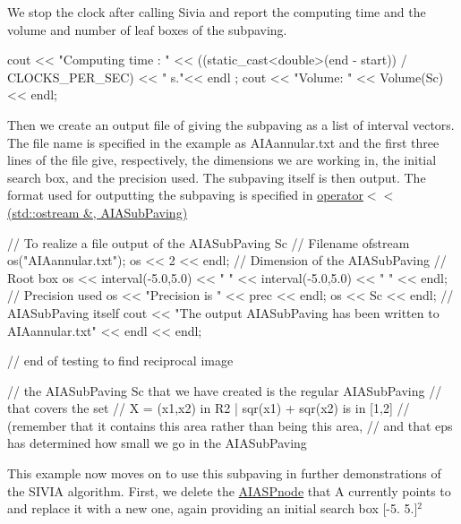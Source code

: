 \-We stop the clock after calling \-Sivia and report the computing time and the volume and number of leaf boxes of the subpaving.


\begin{DoxyCodeInclude}
  cout << "Computing time : " 
       << ((static_cast<double>(end - start)) / CLOCKS_PER_SEC) << " s."<< endl
      ;
  cout << "Volume: " << Volume(Sc) << endl;

\end{DoxyCodeInclude}


\-Then we create an output file of giving the subpaving as a list of interval vectors. \-The file name is specified in the example as \-A\-I\-Aannular.\-txt and the first three lines of the file give, respectively, the dimensions we are working in, the initial search box, and the precision used. \-The subpaving itself is then output. \-The format used for outputting the subpaving is specified in \hyperlink{AIAsubpaving_8cpp_a545707f4bc32ad5dac67608be229b51d}{operator$<$$<$(std\-::ostream \&, A\-I\-A\-Sub\-Paving)}


\begin{DoxyCodeInclude}
  // To realize a file output of the AIASubPaving Sc
                    // Filename
  ofstream os("AIAannular.txt");
  os << 2 << endl;  // Dimension of the AIASubPaving
                    // Root box
  os << interval(-5.0,5.0) << " "
    << interval(-5.0,5.0) << " " << endl;
                    // Precision used
  os << "Precision is " << prec << endl;
  os << Sc << endl; // AIASubPaving itself
  cout << "The output AIASubPaving has been written to AIAannular.txt" 
       << endl << endl;

  // end of testing to find reciprocal image

  // the AIASubPaving Sc that we have created is the regular AIASubPaving 
  // that covers the set
  // X = {(x1,x2) in R2 | sqr(x1) + sqr(x2) is in [1,2]} 
  // (remember that it contains this area rather than being this area, 
  // and that eps has determined how small we go in the AIASubPaving 

\end{DoxyCodeInclude}


\-This example now moves on to use this subpaving in further demonstrations of the \-S\-I\-V\-I\-A algorithm. \-First, we delete the \hyperlink{classAIASPnode}{\-A\-I\-A\-S\-Pnode} that \-A currently points to and replace it with a new one, again providing an initial search box \mbox{[}-\/5. 5.\mbox{]}$^{\mbox{2}}$ 


